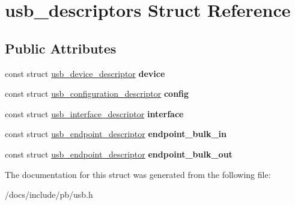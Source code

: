 \hypertarget{structusb__descriptors}{}\section{usb\+\_\+descriptors Struct Reference}
\label{structusb__descriptors}
\subsection*{Public Attributes}
\begin{DoxyCompactItemize}
\item 
\mbox{\label{structusb__descriptors_af4505ec88b6a9554c33a5be91b480206}} 
const struct \hyperlink{structusb__device__descriptor}{usb\+\_\+device\+\_\+descriptor} {\bfseries device}
\item 
\mbox{\label{structusb__descriptors_aa706158ac6a5894aa5db8ba3f9d8ee0f}} 
const struct \hyperlink{structusb__configuration__descriptor}{usb\+\_\+configuration\+\_\+descriptor} {\bfseries config}
\item 
\mbox{\label{structusb__descriptors_a28ca1e21411c801d49ef967f6172e161}} 
const struct \hyperlink{structusb__interface__descriptor}{usb\+\_\+interface\+\_\+descriptor} {\bfseries interface}
\item 
\mbox{\label{structusb__descriptors_a735508f42d719a3213b93fc054ca26a1}} 
const struct \hyperlink{structusb__endpoint__descriptor}{usb\+\_\+endpoint\+\_\+descriptor} {\bfseries endpoint\+\_\+bulk\+\_\+in}
\item 
\mbox{\label{structusb__descriptors_a21d423293e81d623cff808ff006f9272}} 
const struct \hyperlink{structusb__endpoint__descriptor}{usb\+\_\+endpoint\+\_\+descriptor} {\bfseries endpoint\+\_\+bulk\+\_\+out}
\end{DoxyCompactItemize}


The documentation for this struct was generated from the following file\+:\begin{DoxyCompactItemize}
\item 
/docs/include/pb/usb.\+h\end{DoxyCompactItemize}
